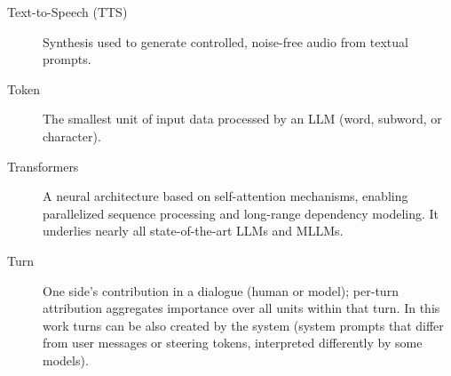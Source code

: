 \begin{description}
    \item[Text-to-Speech (TTS)] Synthesis used to generate controlled, noise-free audio from textual prompts.

    \item[Token] The smallest unit of input data processed by an LLM (word, subword, or character).

    \item[Transformers] A neural architecture based on self-attention mechanisms, enabling parallelized sequence processing and long-range dependency modeling. It underlies nearly all state-of-the-art LLMs and MLLMs.

    \item[Turn] One side’s contribution in a dialogue (human or model); per-turn attribution aggregates importance over all units within that turn. In this work turns can be also created by the system (system prompts that differ from user messages or steering tokens, interpreted differently by some models).

\end{description}

\newpage
\begin{singlespace}
    \setlength{\bibitemsep}{7pt}
    \printbibliography
\end{singlespace}

\newpage \ \null\thispagestyle{empty}\newpage
\listoffigures

\listoftables

\newpage \ \null\thispagestyle{empty}\newpage

